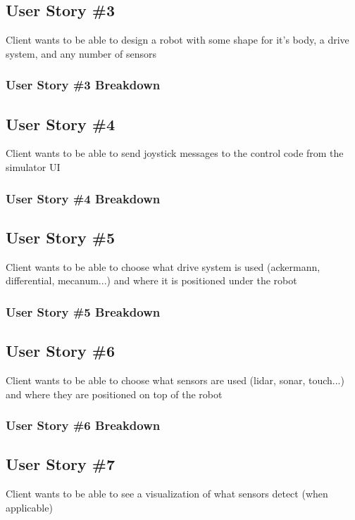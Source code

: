 \subsection{User Story \#3} 
Client wants to be able to design a robot with some shape for it's body, a drive system, and any number of sensors

\subsubsection{User Story \#3 Breakdown}

\subsection{User Story \#4} 
Client wants to be able to send joystick messages to the control code from the simulator UI

\subsubsection{User Story \#4 Breakdown}

\subsection{User Story \#5}
Client wants to be able to choose what drive system is used (ackermann, differential, mecanum...) and where it is positioned under the robot

\subsubsection{User Story \#5 Breakdown}

\subsection{User Story \#6} 
Client wants to be able to choose what sensors are used (lidar, sonar, touch...) and where they are positioned on top of the robot

\subsubsection{User Story \#6 Breakdown}

\subsection{User Story \#7} 
Client wants to be able to see a visualization of what sensors detect (when applicable)

